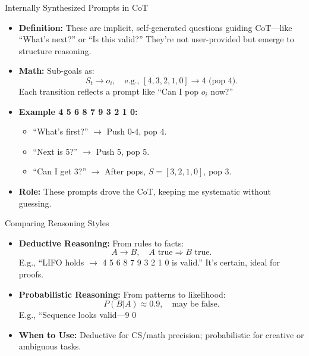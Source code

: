 \begin{frame}{Internally Synthesized Prompts in CoT}
    \begin{itemize}
        \item \textbf{Definition:} These are implicit, self-generated questions guiding CoT—like “What’s next?” or “Is this valid?” They’re not user-provided but emerge to structure reasoning.
        \item \textbf{Math:} Sub-goals as:
        \[
        S_t \rightarrow o_i, \quad \text{e.g., } [4, 3, 2, 1, 0] \rightarrow 4 \text{ (pop 4)}.
        \]
        Each transition reflects a prompt like “Can I pop \( o_i \) now?”
        \item \textbf{Example 4 5 6 8 7 9 3 2 1 0:}
        \begin{itemize}
            \item “What’s first?” $\rightarrow$ Push 0-4, pop 4.
            \item “Next is 5?” $\rightarrow$ Push 5, pop 5.
            \item “Can I get 3?” $\rightarrow$ After pops, \( S = [3, 2, 1, 0] \), pop 3.
        \end{itemize}
        \item \textbf{Role:} These prompts drove the CoT, keeping me systematic without guessing.
    \end{itemize}
\end{frame}

\begin{frame}{Comparing Reasoning Styles}
    \begin{itemize}
        \item \textbf{Deductive Reasoning:} From rules to facts:
        \[
        A \rightarrow B, \quad A \text{ true} \Rightarrow B \text{ true}.
        \]
        E.g., “LIFO holds \(\rightarrow\) 4 5 6 8 7 9 3 2 1 0 is valid.” It’s certain, ideal for proofs.
        \item \textbf{Probabilistic Reasoning:} From patterns to likelihood:
        \[
        P(B|A) \approx 0.9, \quad \text{may be false}.
        \]
        E.g., “Sequence looks valid—9 0%
        \item \textbf{When to Use:} Deductive for CS/math precision; probabilistic for creative or ambiguous tasks.
    \end{itemize}
\end{frame}


